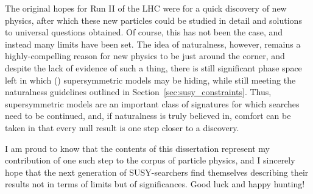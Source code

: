The original hopes for Run II of the LHC were for a quick discovery of new physics, after which these new particles could be studied in detail and solutions to universal questions obtained.
Of course, this has not been the case, and instead many limits have been set.
The idea of naturalness, however, remains a highly-compelling reason for new physics to be just around the corner, and despite the lack of evidence of such a thing, there is still significant phase space left in which (\RPV) supersymmetric models may be hiding, while still meeting the naturalness guidelines outlined in Section~\ref{sec:susy_constraints}.
Thus, supersymmetric models are an important class of signatures for which searches need to be continued, and, if naturalness is truly believed in, comfort can be taken in that every null result is one step closer to a discovery.

I am proud to know that the contents of this dissertation represent my contribution of one such step to the corpus of particle physics, and I sincerely hope that the next generation of SUSY-searchers find themselves describing their results not in terms of limits but of significances.
Good luck and happy hunting!
